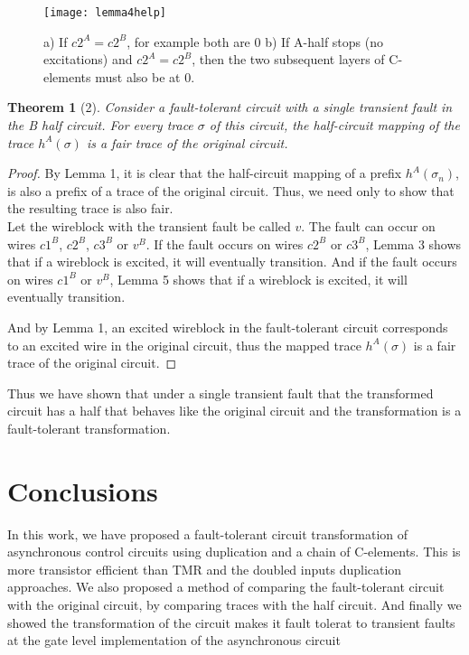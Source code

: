 \documentclass[12pt]{report}
\newtheorem*{theorem}{Theorem}
\newtheorem*{corollary}{Corollary}
\begin{document}
\begin{figure}
\centering
\texttt{[image: lemma4help]}
\caption{a) If $c2^A=c2^B$, for example both are 0 b) If A-half stops (no excitations) and $c2^A=c2^B$, then the two subsequent layers of C-elements must also be at 0. }
\label{fig:t2}
\end{figure}


\begin{theorem}[2]
Consider a fault-tolerant circuit with a single transient fault in the B half circuit. For every trace $\sigma$ of this circuit, the half-circuit mapping of the trace $h^{A}(\sigma)$ is a fair trace of the original circuit. 
\end{theorem}
\begin{proof}
By Lemma 1, it is clear that the half-circuit mapping of a prefix $h^{A}(\sigma_n)$, is also a prefix of a trace of the original circuit. Thus, we need only to show that the resulting trace is also fair.\\

Let the wireblock with the transient fault be called $v$. The fault can occur on wires $c1^B$, $c2^B$, $c3^B$ or $v^B$. If the fault occurs on wires $c2^B$ or $c3^B$, Lemma 3 shows that if a wireblock is excited, it will eventually transition. And if the fault occurs on wires $c1^B$ or $v^B$, Lemma 5 shows that if a wireblock is excited, it will eventually transition. 

And by Lemma 1, an excited wireblock in the fault-tolerant circuit corresponds to an excited wire in the original circuit, thus the mapped trace $h^{A}(\sigma)$ is a fair trace of the original circuit. 
\end{proof}

Thus we have shown that under a single transient fault that the transformed circuit has a half that behaves like the original circuit and the transformation is a fault-tolerant transformation.


\chapter{Conclusions}
In this work, we have proposed a fault-tolerant circuit transformation of asynchronous control circuits using duplication and a chain of C-elements.  This is more transistor efficient than TMR and the doubled inputs duplication approaches.  We also proposed a method of comparing the fault-tolerant circuit with the original circuit, by comparing traces with the half circuit.  And finally we showed the transformation of the circuit makes it fault tolerat to transient faults at the gate level implementation of the asynchronous circuit\\
\end{document}
